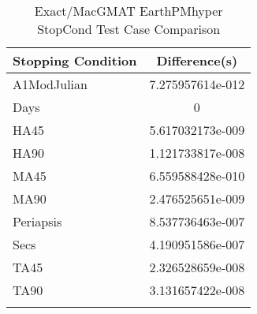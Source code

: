 \begin{table}[htbp!]
\centering
\caption{ Exact/MacGMAT EarthPMhyper StopCond Test Case Comparison}
      \begin{tabular}{lc}
      \hline\hline
          Stopping Condition & Difference(s) \\
         \hline
         A1ModJulian & 7.275957614e-012 \\
         Days & 0 \\
         HA45 & 5.617032173e-009 \\
         HA90 & 1.121733817e-008 \\
         MA45 & 6.559588428e-010 \\
         MA90 & 2.476525651e-009 \\
         Periapsis & 8.537736463e-007 \\
         Secs & 4.190951586e-007 \\
         TA45 & 2.326528659e-008 \\
         TA90 & 3.131657422e-008 \\
      \hline\hline
      \label{Table: Exact-MacGMAT EarthPMhyper StopCond Table} 
\end{tabular}
\end{table}

